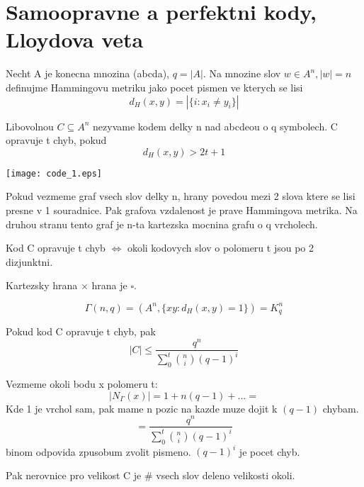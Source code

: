 \section{\texorpdfstring{Samoopravne a perfektni kody, Lloydova veta}{Samoopravne a perfektni kody, Lloydova veta}}
\vspace{5mm}
\large

\begin{definition}
	Necht A je konecna mnozina (abcda), $q = |A|$. Na mnozine slov $w \in A^n, |w| = n$ definujme Hammingovu metriku jako pocet pismen ve kterych se lisi
	\[ d_H(x, y) = |\{i : x_i \neq y_i \}| \]

	Libovolnou $C \subseteq A^n$ nezyvame kodem delky n nad abcdeou o q symbolech. C opravuje t chyb, pokud
	\[ d_H(x, y) > 2t + 1 \]

	\texttt{[image: code\_1.eps]}
\end{definition}

\begin{observation}
	Pokud vezmeme graf vsech slov delky n, hrany povedou mezi 2 slova ktere se lisi presne v 1 souradnice. Pak grafova vzdalenost je prave Hammingova metrika. Na druhou stranu tento graf je n-ta kartezska mocnina grafu o q vrcholech.

	Kod C opravuje t chyb $\iff$ okoli kodovych slov o polomeru t jsou po 2 dizjunktni.
\end{observation}

\begin{observation}
	Kartezsky hrana $\times$ hrana je $\square$.
\end{observation}

\begin{definition}
	\[ \Gamma(n,q) = (A^n, \{xy: d_H(x, y) = 1 \}) = K_q^n \]
\end{definition}

\begin{note}
	Pokud kod C opravuje t chyb, pak
	\[ |C| \leq \frac{q^n}{\sum_0^t \binom{n}{i} (q - 1)^i} \]

	Vezmeme okoli bodu x polomeru t:
	\[ |N_{\Gamma}(x)| = 1 + n(q - 1) + ... = \]
	Kde 1 je vrchol sam, pak mame n pozic na kazde muze dojit k $(q - 1)$ chybam.
	\[ = \frac{q^n}{\sum_0^t \binom{n}{i} (q - 1)^i} \]
	binom odpovida zpusobum zvolit pismeno. $(q - 1)^i$ je pocet chyb.

	Pak nerovnice pro velikost C je \# vsech slov deleno velikosti okoli.

\end{note}

